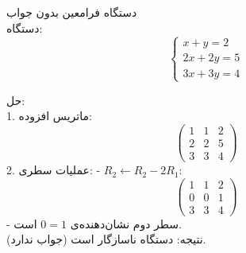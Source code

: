 \begin{example}[]
دستگاه فرامعین بدون جواب\\
دستگاه:
\[
\begin{cases}
	x + y = 2 \\
	2x + 2y = 5 \\
	3x + 3y = 4
\end{cases}
\]

حل:\\
1. ماتریس افزوده:
\[
\left(
\begin{array}{cc|c}
	1 & 1 & 2 \\
	2 & 2 & 5 \\
	3 & 3 & 4
\end{array}
\right)
\]
2. عملیات سطری:
- \( R_2 \leftarrow R_2 - 2R_1 \):
\[
\left(
\begin{array}{cc|c}
	1 & 1 & 2 \\
	0 & 0 & 1 \\
	3 & 3 & 4
\end{array}
\right)
\]
- سطر دوم نشان‌دهنده‌ی \( 0 = 1 \) است.\\

نتیجه: دستگاه ناسازگار است (جواب ندارد).	
\end{example}
